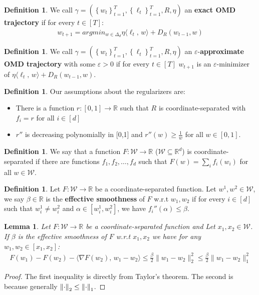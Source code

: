 \documentclass[10pt]{article}
\newtheorem{lemma}[theorem]{Lemma}
\theoremstyle{definition}
\newtheorem{definition}[theorem]{Definition}
\theoremstyle{remark}
\renewcommand{\epsilon}{\varepsilon}
\newcommand{\W}{\mathcal{W}}
\newcommand{\rr}{\mathbb{R}}
\newcommand\inprod[2]{\langle #1,\,#2 \rangle}
\newcommand{\curly}[1]{ {\left\{ #1 \right\}}}
\begin{document}
\begin{definition}
We call $\gamma = (\curly{w_t}_{t=1}^T, \curly{\ell_t}_{t=1}^T, R, \eta)$ an \textbf{exact OMD trajectory} if for every $t\in[T]$:
\begin{align*}
    w_{t+1} = argmin_{w\in\Delta_d} \eta \inprod{\ell_t}{w} + D_R(w_{t-1},w)
\end{align*}
\end{definition}

\begin{definition}
We call $\gamma = (\curly{w_t}_{t=1}^T, \curly{\ell_t}_{t=1}^T, R, \eta)$ an $\epsilon$-\textbf{approximate OMD trajectory} with some $\epsilon>0$ if for every $t\in[T]$ $w_{t+1}$ is an $\epsilon$-minimizer of $\eta \inprod{\ell_t}{w} + D_R(w_{t-1},w)$.
\end{definition}

\begin{definition}
Our assumptions about the regularizers are:
\begin{itemize}
    \item There is a function $r:[0,1]\to\rr$ such that $R$ is coordinate-separated with $f_i=r$ for all $i\in[d]$
    \item $r''$ is decreasing polynomially in [0,1] and $r''(w) \ge \frac{1}{w}$ for all $w\in[0,1]$.
\end{itemize}
\end{definition}

\begin{definition}
We say that a function $F:\W\to\rr$ ($\W\subseteq\rr^d$) is coordinate-separated if there are functions $f_1,f_2,\dots,f_d$ such that $F(w) = \sum_i f_i(w_i)$ for all $w\in\W$.
\end{definition}

\begin{definition}
Let $F:\W\to\rr$ be a coordinate-separated function. Let $w^1,w^2\in\W$, we say $\beta\in\rr$ is the \textbf{effective smoothness} of $F$ w.r.t $w_1,w_2$ if for every $i\in[d]$  such that $w^1_i\ne w^2_i$ and $\alpha\in[w_i^1,w_i^2]$, we have $f_i''(\alpha) \le \beta$. 
\end{definition}

\begin{lemma}\label{lem:effective smoothness}
Let $F:\W\to\rr$ be a coordinate-separated function and Let $x_1,x_2\in\W$. If $\beta$ is the effective smoothness of $F$ w.r.t $x_1,x_2$ we have for any $w_1, w_2 \in [x_1, x_2]$: 
\begin{align*}
    F(w_1) - F(w_2) - \inprod{\nabla F(w_2)}{w_1-w_2} \le \frac{\beta}{2}\|w_1-w_2\|_2^2 \le \frac{\beta}{2}\|w_1-w_2\|_1^2
\end{align*}
\end{lemma}
\begin{proof}
The first inequality is directly from Taylor's theorem. The second is because generally $\norm{\cdot}_2 \le \norm{\cdot}_1$.
\end{proof}
\end{document}
